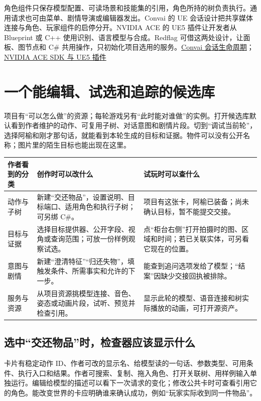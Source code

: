 \documentclass[UTF8,11pt,fontset=fandol,a4paper]{ctexart}
\newcommand{\pg}[1]{\clearpage\section{#1}}
\newcommand{\src}[2]{\href{#1}{#2}}
\begin{document}
角色组件只保存模型配置、可读场景和技能集的引用，角色所持的树负责执行。通用请求也可由菜单、剧情导演或编辑器发出。Convai 的 UE 会话设计把共享媒体连接与角色、玩家组件的启停分开。NVIDIA ACE 的 UE5 插件让开发者从 Blueprint 或 C++ 使用识别、语言模型与合成。Redflag 可借这两处设计，让面板、图节点和 C\# 共用操作，只初始化项目选用的服务。\src{https://github.com/Conv-AI/Convai-Documentation/blob/main/plugins-and-integrations/convai-unreal-engine-plugin/core-concepts/session-lifecycle.md}{Convai 会话生命周期}；\src{https://developer.nvidia.com/blog/build-on-device-ai-companions-with-the-nvidia-ace-game-agent-sdk-and-unreal-engine-5-plugins/}{NVIDIA ACE SDK 与 UE5 插件}

\pg{一个能编辑、试选和追踪的候选库}
项目有“可以怎么做”的资源；每轮游戏另有“此时能对谁做”的实例。打开候选库默认看到作者维护的动作、可复用子树、对话意图和剧情片段。切到“调试当前轮”，选择阿榆和刚才那句话，就能看到本轮生成的目标和证据。物件可以没有公开名称；图片里的陌生目标也能出现在这里。

\begin{center}\small
\begin{tabularx}{\linewidth}{@{}L{24mm}YY@{}}\toprule
作者看到的分类 & 创作时可以改什么 & 试玩时可以查什么 \\ \midrule
动作与子树 & 新建“交还物品”，设置说明、目标端口、适用角色和执行子树；可另绑 C\#。 & 项目有这张卡，阿榆已装备；尚未确认目标，暂不能提交交接。\\
目标与证据 & 选择目标提供器、公开字段、视角或查询范围；可放一份样例观察试选。 & 点“柜台右侧”打开拍摄时的图、区域和时间；若已关联实体，可另看它现在的位置。\\
意图与剧情 & 新建“澄清特征”“归还失物”，填触发条件、所需事实和允许的下一步。 & 能查到追问选项发给了模型；“结案”因缺少交接回执被排除。\\
服务与资源 & 从项目资源挑模型连接、音色、姿态或动画片段，试听、预览并检查引用。 & 显示此轮的模型、语音连接和树实际播放的动画，可打开源资产。\\ \bottomrule
\end{tabularx}
\end{center}

\subsection*{选中“交还物品”时，检查器应该显示什么}
卡片有稳定动作 ID、作者可改的显示名、给模型读的一句话、参数类型、可用条件、执行入口和结果。作者可搜索、复制、拖入角色、打开关联树、用样例输入单独运行。编辑给模型的描述可以看下一次请求的变化；修改公共卡时可查看引用它的角色。能改变世界的卡应明确谁来确认成功，例如“玩家实际收到同一件物品”。
\end{document}
